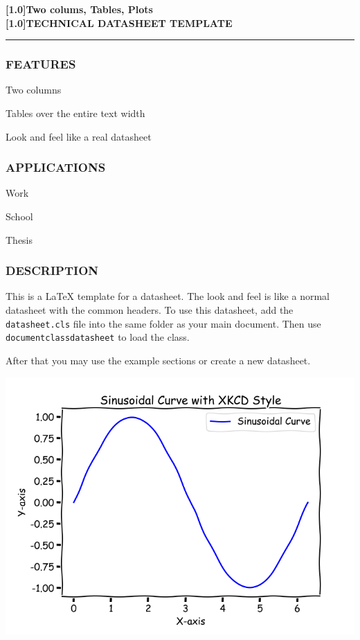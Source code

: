 \newcommand\HRule{\noindent\rule{\linewidth}{2pt}}

{
    \centering
    \Large
    \bf
    \scalebox{.8}[1.0]{Two colums, Tables, Plots}\\
    \scalebox{.8}[1.0]{TECHNICAL DATASHEET TEMPLATE}\\
}
\HRule

\begin{multicols}{2}
\subsubsection*{FEATURES}
\vspace{-3mm}
\begin{compactitem}
    \item Two columns
    \item Tables over the entire text width
    \item Look and feel like a real datasheet
\end{compactitem}

\subsubsection*{APPLICATIONS}
\vspace{-3mm}
\begin{compactitem}
    \item Work
    \item School
    \item Thesis
\end{compactitem}

\columnbreak
\subsubsection*{DESCRIPTION}
\vspace{-3mm}
This is a \LaTeX{} template for a datasheet.
The look and feel is like a normal datasheet with the common headers.
To use this datasheet, add the \texttt{datasheet.cls} file into the same folder as your main document.
Then use \texttt{documentclass{datasheet}} to load the class.


After that you may use the example sections or create a new datasheet.

\end{multicols}
\vfill
{
\centering
\includegraphics[width=\textwidth]{images/plot.png}
}
\newpage
